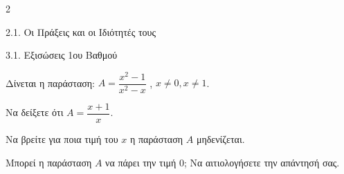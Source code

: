 \begin{ylh}{2}
    \item 2.1. Οι Πράξεις και οι Ιδιότητές τους
    \item 3.1. Εξισώσεις 1ου Βαθμού
\end{ylh}
Δίνεται η παράσταση: $A = \dfrac{x^2-1}{x^2-x}$ , $x \neq 0, x \neq 1$.
\begin{alist}
\item Nα δείξετε ότι $A = \dfrac{x+1}{x}$.
\item
\begin{rlist}
\item Nα βρείτε για ποια τιμή του $x$ η παράσταση $A$ μηδενίζεται.

\item Μπορεί η παράσταση $A$ να πάρει την τιμή $0$; Να αιτιολογήσετε την απάντησή σας.
\end{rlist}
\end{alist}

